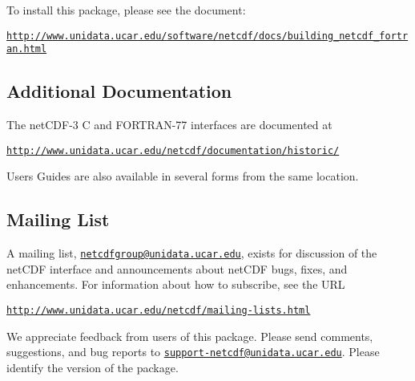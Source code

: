 To install this package, please see the document\+:


\begin{DoxyItemize}
\item \href{http://www.unidata.ucar.edu/software/netcdf/docs/building_netcdf_fortran.html}{\tt http\+://www.\+unidata.\+ucar.\+edu/software/netcdf/docs/building\+\_\+netcdf\+\_\+fortran.\+html}
\end{DoxyItemize}

\subsection*{Additional Documentation }

The net\+C\+D\+F-\/3 C and F\+O\+R\+T\+R\+A\+N-\/77 interfaces are documented at


\begin{DoxyItemize}
\item \href{http://www.unidata.ucar.edu/netcdf/documentation/historic/}{\tt http\+://www.\+unidata.\+ucar.\+edu/netcdf/documentation/historic/}
\end{DoxyItemize}

User\textquotesingle{}s Guides are also available in several forms from the same location.

\subsection*{Mailing List }

A mailing list, \href{mailto:netcdfgroup@unidata.ucar.edu}{\tt netcdfgroup@unidata.\+ucar.\+edu}, exists for discussion of the net\+C\+DF interface and announcements about net\+C\+DF bugs, fixes, and enhancements. For information about how to subscribe, see the U\+RL


\begin{DoxyItemize}
\item \href{http://www.unidata.ucar.edu/netcdf/mailing-lists.html}{\tt http\+://www.\+unidata.\+ucar.\+edu/netcdf/mailing-\/lists.\+html}
\end{DoxyItemize}

We appreciate feedback from users of this package. Please send comments, suggestions, and bug reports to \href{mailto:support-netcdf@unidata.ucar.edu}{\tt support-\/netcdf@unidata.\+ucar.\+edu}. Please identify the version of the package. 